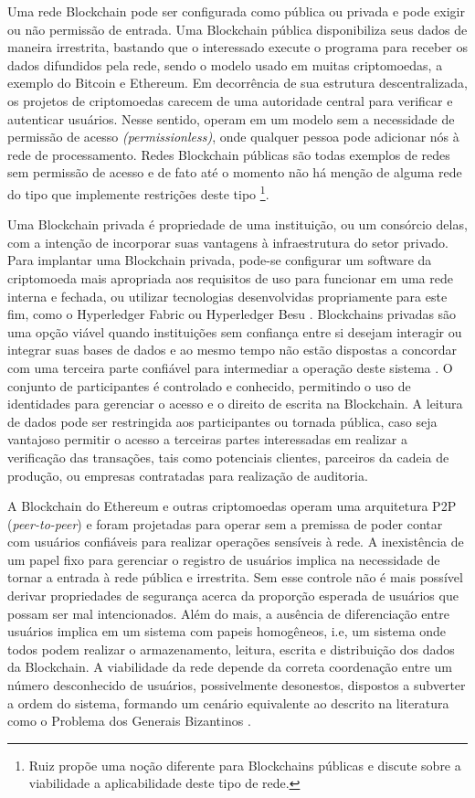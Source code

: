 \documentclass[a4paper,11pt]{article}
\begin{document}
Uma rede Blockchain pode ser configurada como pública ou privada e
pode exigir ou não permissão de entrada. Uma Blockchain pública disponibiliza seus dados de maneira irrestrita, bastando que o interessado execute o programa para receber os dados difundidos pela rede, sendo o modelo usado em muitas criptomoedas, a exemplo do Bitcoin e Ethereum.
Em decorrência de sua estrutura descentralizada, os projetos de criptomoedas carecem de uma autoridade central para verificar e autenticar usuários. Nesse sentido, operam em um modelo sem a necessidade de permissão de acesso \emph{(permissionless)}, onde qualquer pessoa pode adicionar nós à rede de processamento.
Redes Blockchain públicas são todas exemplos de redes sem permissão de acesso e de fato até o momento não há menção de alguma rede do tipo que implemente restrições deste tipo
\footnote{Ruiz\cite{Ruiz2020} propõe uma noção diferente para Blockchains públicas e discute sobre a viabilidade a aplicabilidade deste tipo de rede.}.

Uma Blockchain privada é propriedade de uma instituição, ou um consórcio delas, com a intenção de incorporar suas vantagens à infraestrutura do setor privado.
Para implantar uma Blockchain privada, pode-se configurar um software da criptomoeda mais apropriada aos requisitos de uso para funcionar em uma rede interna e fechada, ou utilizar tecnologias desenvolvidas propriamente para este fim, como o Hyperledger Fabric ou Hyperledger Besu \cite{Blummer2019}.
Blockchains privadas são uma opção viável quando instituições sem confiança entre si desejam interagir ou integrar suas bases de dados e ao mesmo tempo não estão dispostas a concordar com uma terceira parte confiável para intermediar a operação deste sistema \cite{OLeary2017, Wust2017}.
O conjunto de participantes é controlado e conhecido, permitindo o uso de identidades para gerenciar o acesso e o direito de escrita na Blockchain.
A leitura de dados pode ser restringida aos participantes ou tornada pública, caso seja vantajoso permitir o acesso a terceiras partes interessadas em realizar a verificação das transações, tais como potenciais clientes, parceiros da cadeia de produção, ou empresas contratadas para realização de auditoria.

A Blockchain do Ethereum e outras criptomoedas operam uma arquitetura P2P (\textit{peer-to-peer}) e foram projetadas para operar sem a premissa de poder contar com usuários confiáveis para realizar operações sensíveis à rede.
A inexistência de um papel fixo para gerenciar o registro de usuários implica na necessidade de tornar a entrada à rede pública e irrestrita. Sem esse controle não é mais possível derivar propriedades de segurança acerca da proporção esperada de usuários que possam ser mal intencionados.
Além do mais, a ausência de diferenciação entre usuários implica em um sistema com papeis homogêneos, i.e, um sistema onde todos podem realizar o armazenamento, leitura, escrita e distribuição dos dados da Blockchain.
A viabilidade da rede depende da correta coordenação entre um número desconhecido de usuários, possivelmente desonestos, dispostos a subverter a ordem do sistema, formando um cenário equivalente ao descrito na literatura como o Problema dos Generais Bizantinos \cite{Lamport1982}.
\end{document}
